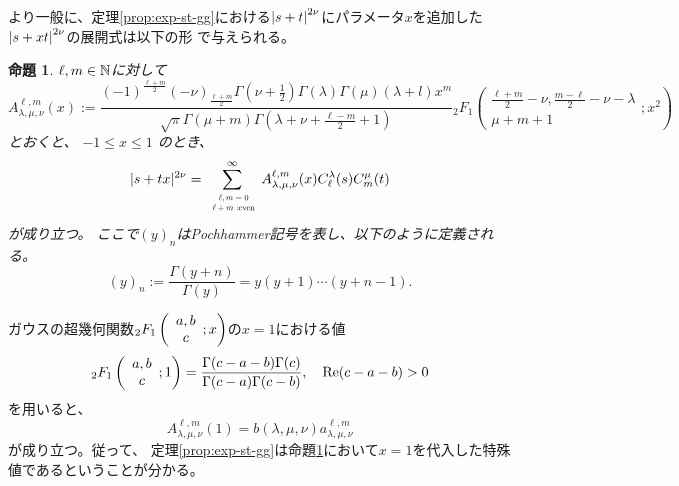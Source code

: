 \documentclass[12pt,a4paper,dvipdfmx]{jsarticle}
\numberwithin{equation}{section}
\newcommand{\tmop}[1]{\ensuremath{\operatorname{#1}}}
\newcommand{\assign}{:=}
\theoremstyle{jplain}
\newtheorem{prop}[thm]{命題}
\theoremstyle{remark}
\theoremstyle{definition}
\begin{document}
	より一般に、定理\ref{prop:exp-st-gg}における$\left|s+t\right|^{2\nu}$にパラメータ$x$を追加した$\left|s+xt\right|^{2\nu}$の展開式は以下の形
	{で}与えられる。
	\begin{prop}\label{prop:exp-stz-gg}
		$\ell,m\in\mathbb{N}$に対して
		    \begin{equation*}
			    A^{\ell,m}_{\lambda,\mu,\nu} (x) \assign
			    \frac{(-1)^{\frac{\ell+m}{2}}(-\nu)_{\frac{\ell+m}{2}}\Gamma \left( \nu + \frac{1}{2} \right) \Gamma
				  (\lambda) \Gamma (\mu) (\lambda + l) x^m }{\sqrt{\pi} \Gamma
				      (\mu + m) \Gamma \left( \lambda + \nu + \frac{\ell - m}{2} + 1 \right)}
				    {}_2 F_1 \left( \begin{array}{c}
				\frac{\ell + m}{2} - \nu, \frac{m - \ell}{2} - \nu - \lambda\\
				\mu + m + 1
			\end{array} ; x^2 \right)
		\end{equation*}
		とおくと、
		    $-1 \leqslant x \leqslant 1$ のとき、
		\begin{equation*}
			       | s + t x |^{2 \nu}  = \sum_{\scalebox{0.6}{
			      $\begin{array}[]{c}
				  \ell,m=0\\\ell+ m\mbox{ :even}
				\end{array}
			$}}^{\infty} A^{\ell,m}_{\lambda,\mu,\nu}
				 (x) C_\ell^{\lambda} (s) C_m^{\mu} (t)
		    \end{equation*}
		    が成り立つ。
		    ここで$(y)_n$はPochhammer記号を表し、以下のように定義される。\begin{equation*}
		(y)_n:=\frac{\Gamma(y+n)}{\Gamma(y)}=y(y+1)\cdots(y+n-1).
	\end{equation*}
    \end{prop}
    ガウスの超幾何関数$_2F_1\left(\begin{array}[]{c}
	    a,b\\c
    \end{array};x\right)$の$x=1$における値
\begin{equation*}
		{}_2F_1\left( \begin{array}[]{c}
			a,b\\c
		\end{array};1\right)=\frac{\Gamma(c-a-b)\Gamma(c)}{\Gamma(c-a)\Gamma(c-b)},\quad \Re(c-a-b)>0
	\end{equation*}
	を用いると、\begin{equation*}
		A^{\ell,m}_{\lambda,\mu,\nu}(1)=b(\lambda,\mu,\nu)a^{
		\ell,m}_{\lambda,\mu,\nu}
	\end{equation*}が成り立つ。従って、
	定理\ref{prop:exp-st-gg}は命題\ref{prop:exp-stz-gg}において$x=1$を代入した特{殊}
	値であるということが分かる。
\end{document}
